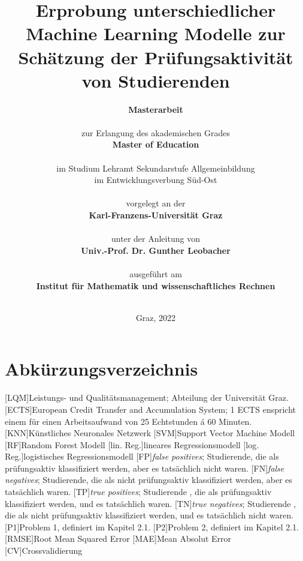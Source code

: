 \documentclass[
    fontsize=12pt,
    paper=A4,
    parskip=full, %
    bibliography=totoc,
    abstract=on,
    listof=totoc,
]{scrreprt} %
\title{
        {Erprobung unterschiedlicher Machine Learning Modelle zur Sch\"atzung der Pr\"ufungsaktivit\"at von Studierenden}
        }
\author{
        
        \Huge{\textbf{Masterarbeit}} \\
        \ \\
        \large{zur Erlangung des akademischen Grades} \\
        \large{\textbf{Master of Education}}\\ 
        \\
        \large{im Studium Lehramt Sekundarstufe Allgemeinbildung}\\
        \large{im Entwicklungsverbung Süd-Ost}\\
        \ \\
        \large{vorgelegt an der} \\
        \large{\textbf{Karl-Franzens-Universität Graz}}\\
        \\
        \large{unter der Anleitung von} \\
        \large{\textbf{Univ.-Prof. Dr. Gunther Leobacher}} \\
        \\
        \large{ausgef\"uhrt am}\\
        \large{\textbf{Institut f\"ur Mathematik und wissenschaftliches Rechnen}}
        \\
        \\
        }
\date{ \normalsize{Graz, 2022}}
\begin{document}
\begin{singlespace}
    \maketitle 
    \setcounter{page}{2}
\end{singlespace}






    \tableofcontents %
    \listoffigures %
    \listoftables %

    \chapter*{Abk\"urzungsverzeichnis}
    \begin{acronym}
        [LQM]{Leistungs- und Qualit\"atsmanagement; Abteilung der Universität Graz.}
        [ECTS]{European Credit Transfer and Accumulation System; 1 ECTS enspricht einem f\"ur einen Arbeitsaufwand von 25 Echtstunden \'a 60 Minuten.}
        [KNN]{K\"unstliches Neuronales Netzwerk}
        [SVM]{Support Vector Machine Modell}
        [RF]{Random Forest Modell}
        [lin. Reg.]{lineares Regressionsmodell}
        [log. Reg.]{logistisches Regressionsmodell}
        [FP]{\textit{false positives}; Studierende, die als pr\"ufungsaktiv klassifiziert werden, aber es tats\"achlich nicht waren.}
        [FN]{\textit{false negatives}; Studierende, die als nicht pr\"ufungsaktiv klassifiziert werden, aber es tats\"achlich waren.}
        [TP]{\textit{true positives}; Studierende , die als pr\"ufungsaktiv klassifiziert werden, und es tats\"achlich waren.}
        [TN]{\textit{true negatives}; Studierende , die als nicht pr\"ufungsaktiv klassifiziert werden, und es tats\"achlich nicht waren.}
        [P1]{Problem 1, definiert im Kapitel 2.1.}
        [P2]{Problem 2, definiert im Kapitel 2.1.}
        [RMSE]{Root Mean Squared Error}
        [MAE]{Mean Absolut Error}
        [CV]{Crossvalidierung}
        
    \end{acronym}
\end{document}
